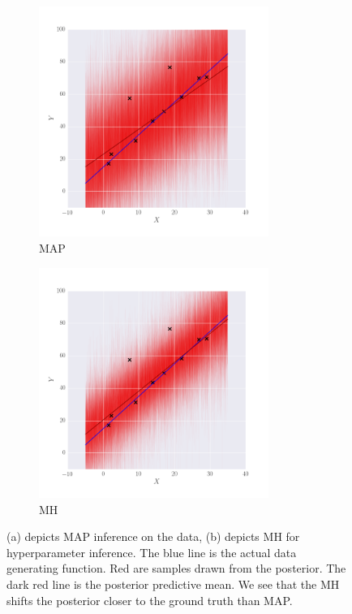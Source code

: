 \begin{figure}
        \centering
        \begin{subfigure}[b]{0.49\textwidth} \centering
              \includegraphics[height=7.5cm]{figs/MAP_linear.png}
              \caption{MAP}
                \label{fig:maplin}
        \end{subfigure}%
        \begin{subfigure}[b]{0.49\textwidth} \centering
            \includegraphics[height=7.5cm]{figs/MH_linear.png}
            \caption{MH}
                \label{fig:mhlin}
        \end{subfigure}%
        \caption{(a) depicts MAP inference on the data, (b) depicts MH for hyperparameter inference. The blue line is the actual data generating function. Red are samples drawn from the posterior. The dark red line is the posterior predictive mean. We see that the MH shifts the posterior closer to the ground truth than MAP.  }\label{fig:BayesVSFreq}
\end{figure}


